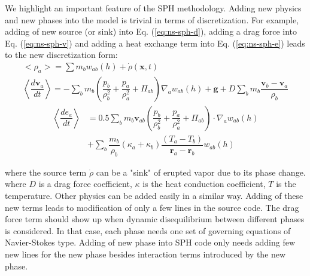 We highlight an important feature of the SPH methodology. Adding new physics and new phases into the model is trivial in terms of discretization. For example, adding of new source (or sink) into Eq. (\ref{eq:ns-sph-d}), adding a drag force into Eq. (\ref{eq:ns-sph-v})  and adding a heat exchange term into Eq. (\ref{eq:ns-sph-e}) leads to the new discretization form:
\begin{align}
<\rho_a> = \sum m_b w_{ab} \left(h\right) + \dot{\rho}\left(\textbf{x},t\right)\label{eq:ns-source-sph-d} \\
\left\langle\dfrac{d \textbf{v}_a}{d t}\right\rangle= -\sum_b m_b \left(\dfrac{p_b}{\rho_b^2} + \dfrac{p_a}{\rho_a^2} + \Pi_{ab}\right) \nabla_a w_{a b}\left(h\right) +\textbf{g} + D \sum	_b m_b \dfrac{\textbf{v}_b - \textbf{v}_a}{\rho_b} \label{eq:ns-drag-sph-v}
\end{align}
\begin{equation}
\begin{split}
\left\langle\dfrac{d e_a}{d t}\right\rangle
&= 0.5\sum_b m_b \textbf{v}_{a b}\left(\dfrac{p_b}{\rho_b^2} + \dfrac{p_a}{\rho_a^2} + \Pi_{ab}\right) \cdot \nabla_a w_{a b}\left(h\right) \\
&+ \sum_b \dfrac{m_b}{\rho_b}\left(\kappa_a + \kappa_b\right) \dfrac{\left(T_a - T_b\right)}{\textbf{r}_a - \textbf{r}_b} w_{ab}\left(h\right) \label{eq:ns-conduction-sph-e}
\end{split}
\end{equation}

where the source term $\dot{\rho}$ can be a "sink" of erupted vapor due to its phase change.
where $D$ is a drag force coefficient, $\kappa$ is the heat conduction coefficient, $T$ is the temperature. Other physics can be added easily in a similar way. Adding of these new terms leads to modification of only a few lines in the source code. The drag force term should show up when dynamic disequilibrium between different phases is considered. In that case, each phase needs one set of governing equations of Navier-Stokes type. Adding of new phase into SPH code only needs adding few new lines for the new phase besides interaction terms introduced by the new phase.

